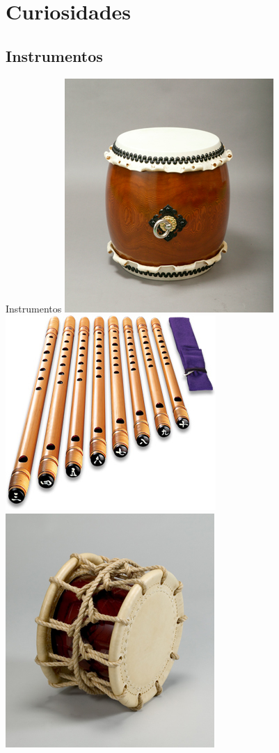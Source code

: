 \documentclass{beamer}
\begin{document}
\section {Curiosidades}
\subsection {Instrumentos}
\begin{frame}{Instrumentos}
    \includegraphics[height=0.2\textheight]{instrumentos-1}
    \includegraphics[height=0.2\textheight]{instrumentos-2}
    \includegraphics[height=0.2\textheight]{instrumentos-3}

\end{frame}
\end{document}

